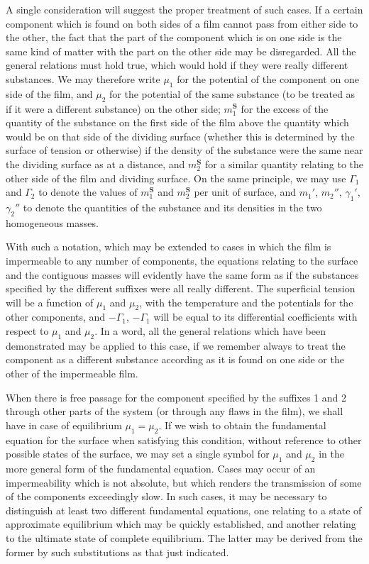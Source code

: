 \documentclass[12pt]{memoir}
\begin{document}
A single consideration will suggest the proper treatment of such cases. If a certain component which is found on both sides of a film cannot pass from either side to the other, the fact that the part of the component which is on one side is the same kind of matter with the part on the other side may be disregarded. All the general relations must hold true, which would hold if they were really different substances. We may therefore write $\mu_1$ for the potential of the component on one side of the film, and $\mu_2$ for the potential of the same substance (to be treated as if it were a different substance) on the other side; $m_1^\mathbf{S}$ for the excess of the quantity of the substance on the first side of the film above the quantity which would be on that side of the dividing surface (whether this is determined by the surface of tension or otherwise) if the density of the substance were the same near the dividing surface as at a distance, and $m_2^\mathbf{S}$ for a similar quantity relating to the other side of the film and dividing surface. On the same principle, we may use $\Gamma_1$ and $\Gamma_2$ to denote the values of $m_1^\mathbf{S}$ and $m_2^\mathbf{S}$ per unit of surface, and $m_1'$, $m_2''$, $\gamma_1'$, $\gamma_2''$ to denote the quantities of the substance and its densities in the two homogeneous masses.

With such a notation, which may be extended to cases in which the film is impermeable to any number of components, the equations relating to the surface and the contiguous masses will evidently have the same form as if the substances specified by the different suffixes were all really different. The superficial tension will be a function of $\mu_1$ and $\mu_2$, with the temperature and the potentials for the other components, and $-\Gamma_1$, $-\Gamma_1$ will be equal to its differential coefficients with respect to $\mu_1$ and $\mu_2$. In a word, all the general relations which have been demonstrated may be applied to this case, if we remember always to treat the component as a different substance according as it is found on one side or the other of the impermeable film.

When there is free passage for the component specified by the suffixes 1 and 2 through other parts of the system (or through any flaws in the film), we shall have in case of equilibrium $\mu_1=\mu_2$. If we wish to obtain the fundamental equation for the surface when satisfying this condition, without reference to other possible states of the surface, we may set a single symbol for $\mu_1$ and $\mu_2$ in the more general form of the fundamental equation. Cases may occur of an impermeability which is not absolute, but which renders the transmission of some of the components exceedingly slow. In such cases, it may be necessary to distinguish at least two different fundamental equations, one relating to a state of approximate equilibrium which may be quickly established, and another relating to the ultimate state of complete equilibrium. The latter may be derived from the former by such substitutions as that just indicated.
\end{document}
